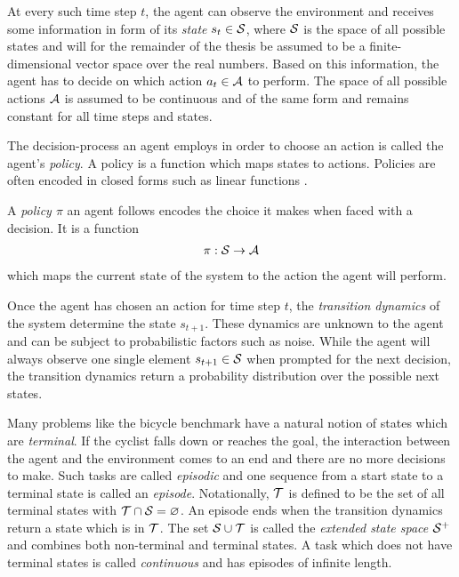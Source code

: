 At every such time step $t$, the agent can observe the environment and receives some information in form of its \emph{state} $s_t \in \mathcal{S}$, where $\mathcal{S}$ is the space of all possible states and will for the remainder of the thesis be assumed to be a finite-dimensional vector space over the real numbers.
Based on this information, the agent has to decide on which action $a_t \in \mathcal{A}$ to perform.
The space of all possible actions $\mathcal{A}$ is assumed to be continuous and of the same form and remains constant for all time steps and states.

The decision-process an agent employs in order to choose an action is called the agent's \emph{policy}.
A policy is a function which maps states to actions.
Policies are often encoded in closed forms such as linear functions \cite{deisenroth_efficient_2010}.
\begin{definition}[Policy]
    A \emph{policy $\pi$} an agent follows encodes the choice it makes when faced with a decision.
    It is a function
    \begin{align}
        \pi : \Es \to \Ah
    \end{align}
    which maps the current state of the system to the action the agent will perform.
\end{definition}

Once the agent has chosen an action for time step $t$, the \emph{transition dynamics} of the system determine the state $s_{t+1}$.
These dynamics are unknown to the agent and can be subject to probabilistic factors such as noise.
While the agent will always observe one single element $s_{t+1} \in \mathcal{S}$ when prompted for the next decision, the transition dynamics return a probability distribution over the possible next states.

Many problems like the bicycle benchmark have a natural notion of states which are \emph{terminal}.
If the cyclist falls down or reaches the goal, the interaction between the agent and the environment comes to an end and there are no more decisions to make.
Such tasks are called \emph{episodic} and one sequence from a start state to a terminal state is called an \emph{episode}.
Notationally, $\mathcal{T}$ is defined to be the set of all terminal states with $\mathcal{T} \cap \mathcal{S} = \varnothing$.
An episode ends when the transition dynamics return a state which is in $\mathcal{T}$.
The set $\mathcal{S} \cup \mathcal{T}$ is called the \emph{extended state space $\mathcal{S}^+$} and combines both non-terminal and terminal states.
A task which does not have terminal states is called \emph{continuous} and has episodes of infinite length.

